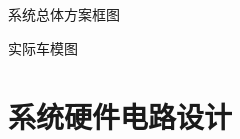 \documentclass{article}%
\begin{document}
\begin{multicols}{2}
		\begin{center}
			\caption{系统总体方案框图}
		\end{center}
		\begin{center}
			\caption{实际车模图}		
		\end{center}
		
		
		\section{系统硬件电路设计}
		

\end{multicols}
\end{document}
